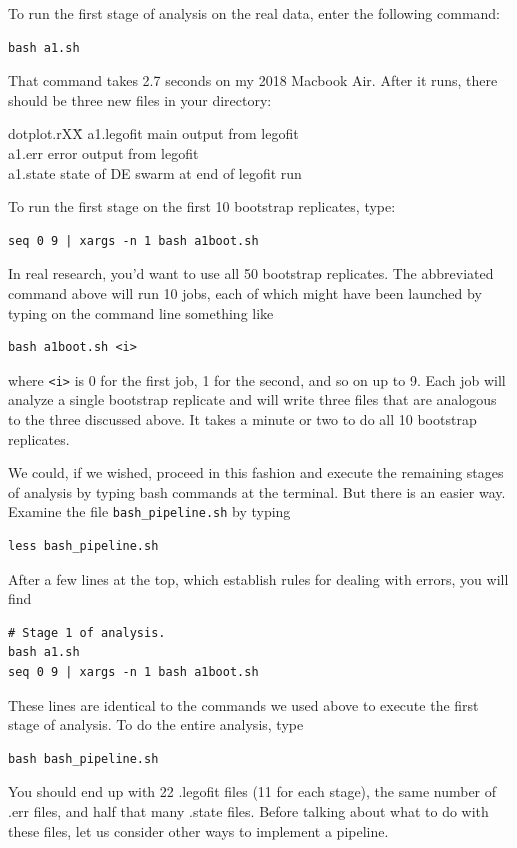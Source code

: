 \documentclass[11pt]{article}
\newenvironment{leftindent}%
{\begin{list}{}%
         {\setlength{\leftmargin}{2em}}%
         \item[]%
}{\end{list}}
\begin{document}
To run the first stage of analysis on the real data, enter the
following command:
\begin{verbatim}
bash a1.sh
\end{verbatim}
That command takes 2.7 seconds on my 2018 Macbook Air. After it runs,
there should be three new files in your directory:
\begin{leftindent}
  \begin{tabbing}
  dotplot.rXX\=\kill
    a1.legofit \> main output from legofit\\
    a1.err     \> error output from legofit\\
    a1.state   \> state of DE swarm at end of legofit run
  \end{tabbing}
\end{leftindent}
To run the first stage on the first 10 bootstrap replicates, type:
\begin{verbatim}
seq 0 9 | xargs -n 1 bash a1boot.sh
\end{verbatim}
In real research, you'd want to use all 50 bootstrap replicates.  The
abbreviated command above will run 10 jobs, each of which might have
been launched by typing on the command line something like
\begin{verbatim}
bash a1boot.sh <i>
\end{verbatim}
where \verb|<i>| is 0 for the first job, 1 for the second, and so on
up to 9. Each job will analyze a single bootstrap replicate and will
write three files that are analogous to the three discussed above. It
takes a minute or two to do all 10 bootstrap replicates.

We could, if we wished, proceed in this fashion and execute the
remaining stages of analysis by typing bash commands at the
terminal. But there is an easier way. Examine the file
\verb|bash_pipeline.sh| by typing 
\begin{verbatim}
less bash_pipeline.sh
\end{verbatim}
After a few lines at the top, which establish rules for dealing with
errors, you will find
\begin{verbatim}
# Stage 1 of analysis.
bash a1.sh
seq 0 9 | xargs -n 1 bash a1boot.sh
\end{verbatim}
These lines are identical to the commands we used above to execute the
first stage of analysis. To do the entire analysis, type
\begin{verbatim}
bash bash_pipeline.sh
\end{verbatim}
You should end up with 22 .legofit files (11 for each stage), the same
number of .err files, and half that many .state files. Before talking
about what to do with these files, let us consider other ways to
implement a pipeline.
\end{document}
